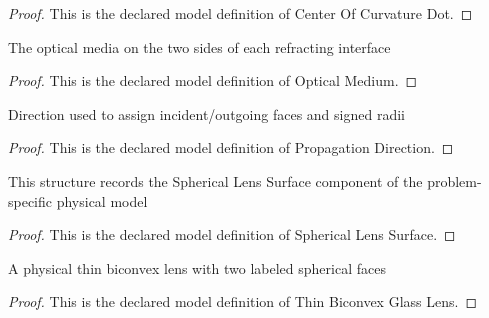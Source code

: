 \begin{proof}
  This is the declared model definition of Center Of Curvature Dot.
\end{proof}
\begin{definition}
  \label{def:physics:phyx-mini-0064:phyxminiproblems-problemphyxmini0064-opticalmedium}
  The optical media on the two sides of each refracting interface
\end{definition}
\begin{proof}
  This is the declared model definition of Optical Medium.
\end{proof}
\begin{definition}
  \label{def:physics:phyx-mini-0064:phyxminiproblems-problemphyxmini0064-propagationdirection}
  Direction used to assign incident/outgoing faces and signed radii
\end{definition}
\begin{proof}
  This is the declared model definition of Propagation Direction.
\end{proof}
\begin{definition}
  \label{def:physics:phyx-mini-0064:phyxminiproblems-problemphyxmini0064-sphericallenssurface}
  This structure records the Spherical Lens Surface component of the problem-specific physical model
\end{definition}
\begin{proof}
  This is the declared model definition of Spherical Lens Surface.
\end{proof}
\begin{definition}
  \label{def:physics:phyx-mini-0064:phyxminiproblems-problemphyxmini0064-thinbiconvexglasslens}
  A physical thin biconvex lens with two labeled spherical faces
\end{definition}
\begin{proof}
  This is the declared model definition of Thin Biconvex Glass Lens.
\end{proof}
